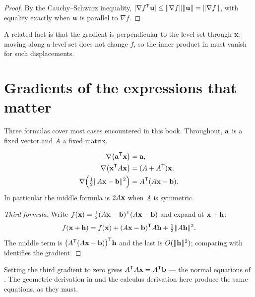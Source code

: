 \begin{proof}
By the Cauchy--Schwarz inequality,
\(|\nabla f^{\mathsf{T}}\mathbf{u}|\le\lVert\nabla f\rVert\lVert\mathbf{u}\rVert
=\lVert\nabla f\rVert\), with equality exactly when \(\mathbf{u}\) is parallel to
\(\nabla f\).
\end{proof}


A related fact is that the gradient is perpendicular to the level set through
\(\mathbf{x}\): moving along a level set does not change \(f\), so the inner
product in  must vanish for such displacements.

\section{Gradients of the expressions that matter}

Three formulas cover most cases encountered in this book. Throughout,
\(\mathbf{a}\) is a fixed vector and \(A\) a fixed matrix.

\begin{proposition}
\begin{align*}
	\nabla\bigl(\mathbf{a}^{\mathsf{T}}\mathbf{x}\bigr)&=\mathbf{a},\\
	\nabla\bigl(\mathbf{x}^{\mathsf{T}} A\mathbf{x}\bigr)&=(A+A^{\mathsf{T}})\mathbf{x},\\
	\nabla\Bigl(\tfrac12\lVert A\mathbf{x}-\mathbf{b}\rVert^{2}\Bigr)
		&=A^{\mathsf{T}}(A\mathbf{x}-\mathbf{b}).
\end{align*}
In particular the middle formula is \(2A\mathbf{x}\) when \(A\) is symmetric.
\end{proposition}

\begin{proof}[Third formula]
Write \(f(\mathbf{x})=\tfrac12(A\mathbf{x}-\mathbf{b})^{\mathsf{T}}(A\mathbf{x}-\mathbf{b})\) and
expand at \(\mathbf{x}+\mathbf{h}\):
\[
	f(\mathbf{x}+\mathbf{h})=f(\mathbf{x})
	+(A\mathbf{x}-\mathbf{b})^{\mathsf{T}} A\mathbf{h}
	+\tfrac12\lVert A\mathbf{h}\rVert^{2}.
\]
The middle term is \(\bigl(A^{\mathsf{T}}(A\mathbf{x}-\mathbf{b})\bigr)^{\mathsf{T}}\mathbf{h}\) and the
last is \(O(\lVert\mathbf{h}\rVert^{2})\); comparing with 
identifies the gradient.
\end{proof}

\begin{remark}
Setting the third gradient to zero gives \(A^{\mathsf{T}} A\mathbf{x}=A^{\mathsf{T}}\mathbf{b}\) --- the
normal equations of . The geometric derivation in
 and the calculus derivation here produce the same
equations, as they must.
\end{remark}

